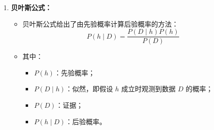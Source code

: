 \documentclass[../main.tex]{subfiles}
\begin{document}
\begin{enumerate}
\begin{itemize}
        \item \textbf{后验概率：}在给定训练数据 $D$ 后，假设 $h$ 成立的概率，记为
        $$
        P(h\mid D)
        $$
        这是机器学习中真正关心的概率。
    \end{itemize}

    \item \textbf{贝叶斯公式：}
    \begin{itemize}
        \item 贝叶斯公式给出了由先验概率计算后验概率的方法：
        $$
        P(h\mid D)=\frac{P(D\mid h)P(h)}{P(D)}
        $$
        \item 其中：
        \begin{itemize}
            \item $P(h)$：先验概率；
            \item $P(D\mid h)$：似然，即假设 $h$ 成立时观测到数据 $D$ 的概率；
            \item $P(D)$：证据；
            \item $P(h\mid D)$：后验概率。
        \end{itemize}
    \end{itemize}
\end{enumerate}
\end{document}
